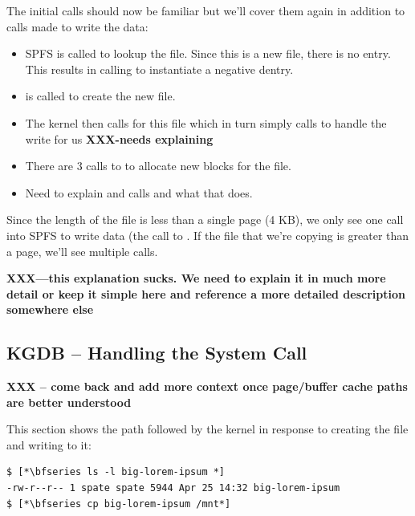 \noindent
The initial calls should now be familiar but we'll cover them again in addition to calls made to write the data:

\begin{itemize}
	\item SPFS is called to lookup the file. Since this is a new file, there is no entry. This results in
		 calling  to instantiate a negative dentry.
	\item {} is called to create the new file.
	\item The kernel then calls  for this file which in turn simply calls 
		 to handle the write for us {\bfseries XXX-needs explaining}
	\item There are 3 calls to  to allocate new blocks for the file.
	\item Need to explain  and  calls and what that does.
\end{itemize}

\noindent
Since the length of the file is less than a single page (4 KB), we only see one call into SPFS to write data (the call to . If the file that we're copying is greater than a page, we'll see multiple calls.

{\bfseries XXX---this explanation sucks. We need to explain it in much more detail or keep it simple here and reference a more detailed description somewhere else}


\subsection{KGDB -- Handling the  System Call}

\textbf{XXX -- come back and add more context once page/buffer cache paths are better understood}

This section shows the path followed by the kernel in response to creating the file and writing to it:

\begin{lstlisting}
$ [*\bfseries ls -l big-lorem-ipsum *]
-rw-r--r-- 1 spate spate 5944 Apr 25 14:32 big-lorem-ipsum
$ [*\bfseries cp big-lorem-ipsum /mnt*]
\end{lstlisting}

